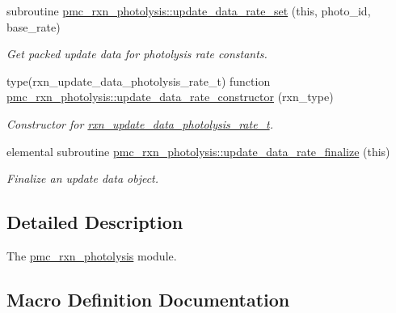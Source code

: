 \begin{DoxyCompactItemize}
subroutine \mbox{\hyperlink{namespacepmc__rxn__photolysis_a83d27d14ea7ff279329cc7cad6cd616c}{pmc\+\_\+rxn\+\_\+photolysis\+::update\+\_\+data\+\_\+rate\+\_\+set}} (this, photo\+\_\+id, base\+\_\+rate)
\begin{DoxyCompactList}\small\item\em Get packed update data for photolysis rate constants. \end{DoxyCompactList}\item 
type(rxn\+\_\+update\+\_\+data\+\_\+photolysis\+\_\+rate\+\_\+t) function \mbox{\hyperlink{namespacepmc__rxn__photolysis_a4fe4efadea794efc7519232ef99ff299}{pmc\+\_\+rxn\+\_\+photolysis\+::update\+\_\+data\+\_\+rate\+\_\+constructor}} (rxn\+\_\+type)
\begin{DoxyCompactList}\small\item\em Constructor for \mbox{\hyperlink{structpmc__rxn__photolysis_1_1rxn__update__data__photolysis__rate__t}{rxn\+\_\+update\+\_\+data\+\_\+photolysis\+\_\+rate\+\_\+t}}. \end{DoxyCompactList}\item 
elemental subroutine \mbox{\hyperlink{namespacepmc__rxn__photolysis_afc60a7f115d5014f760edaf1fefe8c24}{pmc\+\_\+rxn\+\_\+photolysis\+::update\+\_\+data\+\_\+rate\+\_\+finalize}} (this)
\begin{DoxyCompactList}\small\item\em Finalize an update data object. \end{DoxyCompactList}\end{DoxyCompactItemize}


\subsection{Detailed Description}
The \mbox{\hyperlink{namespacepmc__rxn__photolysis}{pmc\+\_\+rxn\+\_\+photolysis}} module. 



\subsection{Macro Definition Documentation}
\mbox{\label{rxn__photolysis_8_f90_a37208659695f932d38e7ff0854b195da}} 
